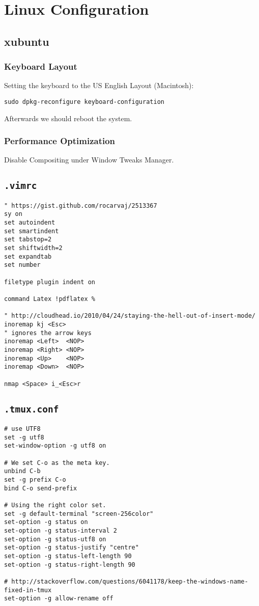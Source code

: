 \documentclass[../main/main.tex]{subfiles}
\begin{document}
\section{Linux Configuration}
\subsection{xubuntu}

\subsubsection{Keyboard Layout}

Setting the keyboard to the US English Layout (Macintosh):

\begin{lstlisting}
sudo dpkg-reconfigure keyboard-configuration
\end{lstlisting}

Afterwards we should reboot the system. 

\subsubsection{Performance Optimization}

Disable Compositing under Window Tweaks Manager. 


\subsection{\lstinline|.vimrc|}
\begin{lstlisting}
" https://gist.github.com/rocarvaj/2513367
sy on
set autoindent
set smartindent
set tabstop=2
set shiftwidth=2
set expandtab
set number

filetype plugin indent on

command Latex !pdflatex %

" http://cloudhead.io/2010/04/24/staying-the-hell-out-of-insert-mode/
inoremap kj <Esc>
" ignores the arrow keys 
inoremap <Left>  <NOP>
inoremap <Right> <NOP>
inoremap <Up>    <NOP>
inoremap <Down>  <NOP>

nmap <Space> i_<Esc>r
\end{lstlisting}

\subsection{\lstinline|.tmux.conf|}

\begin{lstlisting}
# use UTF8
set -g utf8
set-window-option -g utf8 on

# We set C-o as the meta key. 
unbind C-b
set -g prefix C-o
bind C-o send-prefix

# Using the right color set. 
set -g default-terminal "screen-256color"
set-option -g status on
set-option -g status-interval 2
set-option -g status-utf8 on
set-option -g status-justify "centre"
set-option -g status-left-length 90
set-option -g status-right-length 90

# http://stackoverflow.com/questions/6041178/keep-the-windows-name-fixed-in-tmux
set-option -g allow-rename off
\end{lstlisting}
\end{document}
